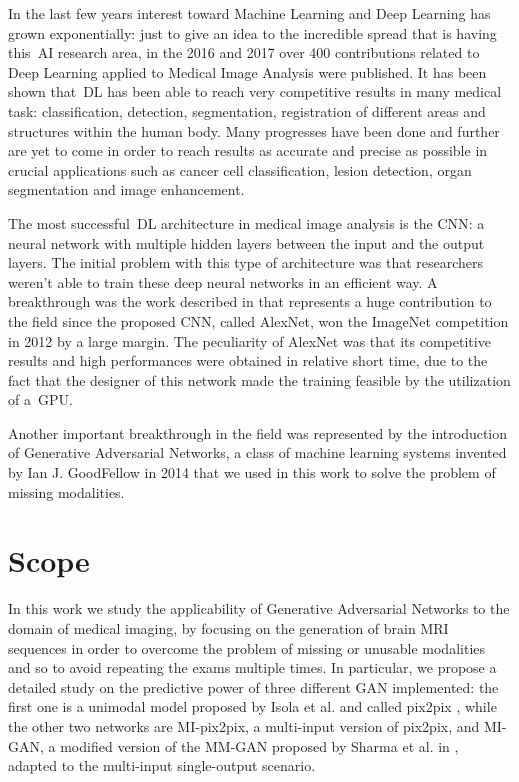 \vspace{5mm} %
In the last few years interest toward Machine Learning and Deep Learning has grown exponentially: just to give an idea to the incredible spread that is having this~\ac{AI} research area, in the 2016 and 2017 over 400 contributions related to Deep Learning applied to Medical Image Analysis were published\cite{Yi_2019}.
It has been shown that~\ac{DL} has been able to reach very competitive results in many medical task: classification, detection, segmentation, registration of different areas and structures within the human body.
Many progresses have been done and further are yet to come in order to reach results as accurate and precise as possible in crucial applications such as cancer cell classification, lesion detection, organ segmentation and image enhancement\cite{Litjens_2017}.

\vspace{5mm} %
The most successful~\ac{DL} architecture in medical image analysis is the \ac{CNN}: a neural network with multiple hidden layers between the input and the output layers. The initial problem with this type of architecture was that researchers weren't able to train these deep neural networks in an efficient way.
A breakthrough was the work described in\cite{dl} that represents a huge contribution to the field since the proposed CNN, called AlexNet, won the ImageNet competition in 2012 by a large margin. The peculiarity of AlexNet was that its competitive results and high performances were obtained in relative short time, due to the fact that the designer of this network made the training feasible by the utilization of a~\ac{GPU}.

\vspace{5mm} %
Another important breakthrough in the field was represented by the introduction of Generative Adversarial Networks, a class of machine learning systems invented by Ian J. GoodFellow in 2014\cite{gan} that we used in this work to solve the problem of missing modalities.

\section{Scope}
\label{sec:scope}
In this work we study the applicability of Generative Adversarial Networks to the domain of medical imaging, by focusing on the generation of brain MRI sequences in order to overcome the problem of missing or unusable modalities and so to avoid repeating the exams multiple times.
In particular, we propose a detailed study on the predictive power of three different \ac{GAN} implemented: the first one is a unimodal model proposed by Isola et al. and called pix2pix \cite{pix2pix}, while the other two networks are MI-pix2pix, a multi-input version of pix2pix, and MI-GAN, a modified version of the MM-GAN proposed by Sharma et al. in \cite{migan}, adapted to the multi-input single-output scenario. 

